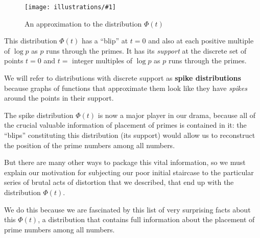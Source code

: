 \documentclass[11pt]{article}
\newcommand{\ill}[3]{ 
   \begin{figure}[htbp]
   \begin{center}
   \texttt{[image: illustrations/\#1]}
   \caption{#3}
   \end{center}
    \end{figure}
}
\theoremstyle{plain}
\theoremstyle{definition}
\numberwithin{equation}{section}
\numberwithin{figure}{section}
\numberwithin{table}{section}
\begin{document}
  
\bigskip
   
   
\ill{phi_50}{0.6}{An approximation to the distribution $\Phi(t)$}
     
\bigskip


This distribution $\Phi(t)$ has a ``blip'' at $t=0$ and also at each
positive multiple of $\log p$ as $p$ runs through the primes.  It has
its {\em support} at the discrete set of points $t=0$ and $t=$
integer multiples of $\log p$ as $p$ runs through the primes.


We will refer to distributions with discrete support as {\bf spike
  distributions} because graphs of functions that approximate them
look like they have {\em spikes} around the points in their support.

The spike distribution $\Phi(t)$ is now a major player in our drama,
because all of the crucial valuable information of placement of primes
is contained in it: the ``blips'' constituting this distribution (its
support) would allow us to reconstruct the position of the prime
numbers among all numbers.

But there are many other ways to package this vital information, so we
must explain our motivation for subjecting our poor initial staircase
to the particular series of brutal acts of distortion that we
described, that end up with the distribution $\Phi(t)$.

We do this because we are fascinated by this list of very surprising
facts about this $\Phi(t)$, a distribution that contains full
information about the placement of prime numbers among all numbers.
\end{document}
